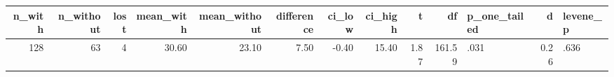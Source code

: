 \begin{tabular}{rrrrrrrrrrlrl}
  \toprule
n\_with & n\_without & lost & mean\_with & mean\_without & difference & ci\_low & ci\_high & t & df & p\_one\_tailed & d & levene\_p \\ 
  \midrule
128 &  63 &   4 & 30.60 & 23.10 & 7.50 & -0.40 & 15.40 & 1.87 & 161.59 & .031 & 0.26 & .636 \\ 
   \bottomrule
\end{tabular}
